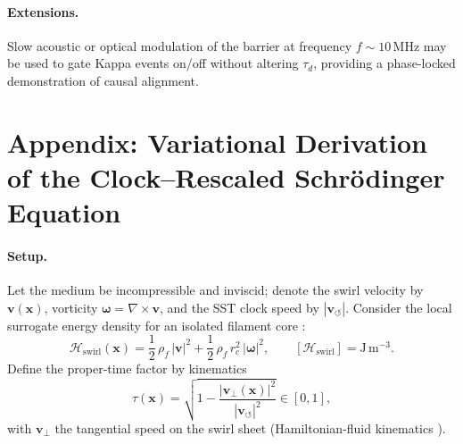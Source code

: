 \documentclass[10pt,reprint,aps,onecolumn,nofootinbib]{revtex4-2}
\begin{document}
    \paragraph{Extensions.}
    Slow acoustic or optical modulation of the barrier at frequency $f \sim 10\,\mathrm{MHz}$ may be used to gate Kappa events on/off without altering $\tau_d$, providing a phase-locked demonstration of causal alignment.


\section{Appendix: Variational Derivation of the Clock–Rescaled Schrödinger Equation}
\label{app:swirlclock-derivation}

    \paragraph{Setup.}
        Let the medium be incompressible and inviscid; denote the swirl velocity by
        \(\mathbf{v}(\mathbf{x})\),
        vorticity \(\boldsymbol{\omega}=\nabla\times\mathbf{v}\),
        and the SST clock speed by \(|\mathbf{v}_{\!\boldsymbol{\circlearrowleft}}|\).
        Consider the local surrogate energy density for an isolated filament core
        \cite{Saffman1992,Batchelor1967,LandauFM}:
        \begin{equation}
        \mathcal{H}_{\text{swirl}}(\mathbf{x})=\frac{1}{2}\,\rho_{\!f}\,|\mathbf{v}|^{2}
        +\frac{1}{2}\,\rho_{\!f}\,r_c^{2}\,|\boldsymbol{\omega}|^{2},
        \qquad
        [\mathcal{H}_{\text{swirl}}]=\mathrm{J\,m^{-3}}.
        \end{equation}
        Define the proper‐time factor by kinematics
        \begin{equation}
        \tau(\mathbf{x})=\sqrt{1-\frac{|\mathbf{v}_\perp(\mathbf{x})|^{2}}{|\mathbf{v}_{\!\boldsymbol{\circlearrowleft}}|^{2}}}\in[0,1],
        \end{equation}
        with \(\mathbf{v}_\perp\) the tangential speed on the swirl sheet (Hamiltonian-fluid kinematics
        \cite{Salmon1988,Morrison1998}).
\end{document}
